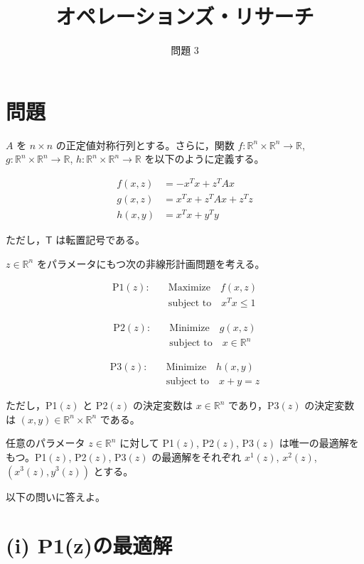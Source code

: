 \documentclass[12pt,a4paper]{article}
\title{オペレーションズ・リサーチ}
\author{問題 3}
\begin{document}
\maketitle

\section*{問題}

$A$ を $n \times n$ の正定値対称行列とする。さらに，関数 $f: \mathbb{R}^n \times \mathbb{R}^n \to \mathbb{R}$, $g: \mathbb{R}^n \times \mathbb{R}^n \to \mathbb{R}$, $h: \mathbb{R}^n \times \mathbb{R}^n \to \mathbb{R}$ を以下のように定義する。

\begin{align}
f(x,z) &= -x^T x + z^T A x \\
g(x,z) &= x^T x + z^T A x + z^T z \\
h(x,y) &= x^T x + y^T y
\end{align}

ただし，$\mathsf{T}$ は転置記号である。

$z \in \mathbb{R}^n$ をパラメータにもつ次の非線形計画問題を考える。

\begin{align}
\text{P1}(z): \quad & \text{Maximize} \quad f(x,z) \\
& \text{subject to} \quad x^T x \leq 1
\end{align}

\begin{align}
\text{P2}(z): \quad & \text{Minimize} \quad g(x,z) \\
& \text{subject to} \quad x \in \mathbb{R}^n
\end{align}

\begin{align}
\text{P3}(z): \quad & \text{Minimize} \quad h(x,y) \\
& \text{subject to} \quad x + y = z
\end{align}

ただし，P1$(z)$ と P2$(z)$ の決定変数は $x \in \mathbb{R}^n$ であり，P3$(z)$ の決定変数は $(x,y) \in \mathbb{R}^n \times \mathbb{R}^n$ である。

任意のパラメータ $z \in \mathbb{R}^n$ に対して P1$(z)$, P2$(z)$, P3$(z)$ は唯一の最適解をもつ。P1$(z)$, P2$(z)$, P3$(z)$ の最適解をそれぞれ $x^1(z)$, $x^2(z)$, $(x^3(z), y^3(z))$ とする。

以下の問いに答えよ。

\section*{(i) P1(z)の最適解}
\end{document}
